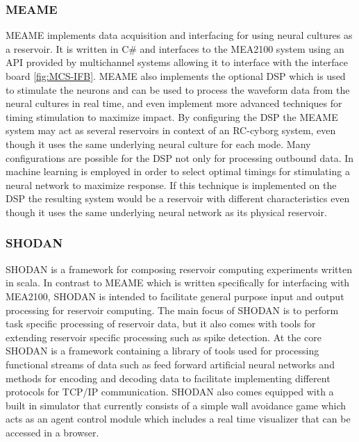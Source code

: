 \subsubsection{MEAME}
MEAME \cite{MEAME} implements data acquisition and interfacing for using neural cultures as a
reservoir.
It is written in C\# and interfaces to the MEA2100 system using an API provided
by multichannel systems allowing it to interface with the interface board
\ref{fig:MCS-IFB}.
MEAME also implements the optional DSP which is used to stimulate the neurons
and can be used to process the waveform data from the neural cultures in real
time, and even implement more advanced techniques for timing stimulation to
maximize impact.
By configuring the DSP the MEAME system may act as several reservoirs in context
of an RC-cyborg system, even though it uses the same underlying neural culture
for each mode.
Many configurations are possible for the DSP not only for processing outbound
data.
In \cite{kumar_autonomous_2016} machine learning is employed in order to select
optimal timings for stimulating a neural network to maximize response.
If this technique is implemented on the DSP the resulting system would be a
reservoir with different characteristics even though it uses the same underlying
neural network as its physical reservoir.
\subsubsection{SHODAN}
SHODAN \cite{SHODAN} is a framework for composing reservoir computing experiments written in
scala. In contrast to MEAME which is written specifically for interfacing with
MEA2100, SHODAN is intended to facilitate general purpose input and output
processing for reservoir computing.
The main focus of SHODAN is to perform task specific processing of reservoir
data, but it also comes with tools for extending reservoir specific processing
such as spike detection.
At the core SHODAN is a framework containing a library of tools used for
processing functional streams of data such as feed forward artificial neural
networks and methods for encoding and decoding data to facilitate implementing
different protocols for TCP/IP communication.
SHODAN also comes equipped with a built in simulator that currently consists of
a simple wall avoidance game which acts as an agent control module which
includes a real time visualizer that can be accessed in a browser.
